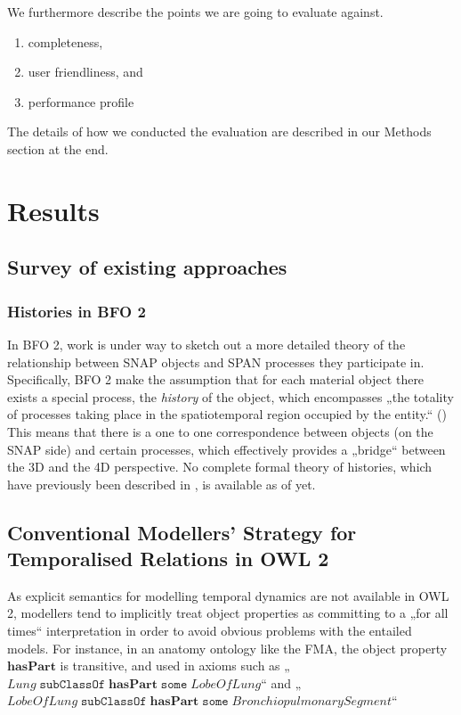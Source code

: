 \documentclass[10pt]{bmc_article}
\newcommand{\mirel}[1]{\ensuremath{\mathrm{\mathbf{#1}}}}
\newcommand{\mclass}[1]{\ensuremath{\mathit{#1}}}
\newenvironment{bmcformat}{\baselineskip20pt\sloppy\setboolean{publ}{false}}{\baselineskip20pt\sloppy}
\begin{document}
\begin{bmcformat}
We furthermore describe the points we are going to evaluate against. 
\begin{enumerate}
	\item completeness, 
	\item user friendliness, and 
	\item performance profile
\end{enumerate}
The details of how we conducted the evaluation are described in our Methods section at the end. 


\section*{Results}

\subsection*{Survey of existing approaches}

\subsubsection*{Histories in BFO 2}

In BFO 2, work is under way to sketch out a more detailed theory of the
relationship between SNAP objects and SPAN processes they participate in.
Specifically, BFO 2 make the assumption that for each material object there
exists a special process, the \emph{history} of the object, which encompasses 
„the totality of processes taking place in the spatiotemporal region occupied by
the entity.“ (\cite{BFO2:ref}) This means that there is a one to one correspondence
between objects (on the SNAP side) and certain processes, which effectively
provides a „bridge“ between the 3D and the 4D perspective. No complete formal theory
of histories, which have previously been described in \cite{cornucopia}, is available as of yet.
\subsection{Conventional Modellers’ Strategy for Temporalised Relations in OWL 2}

As explicit semantics for modelling temporal dynamics are not available in OWL
2, modellers tend to implicitly treat object properties as committing to a 
„for all times“ interpretation in order to avoid obvious problems with the
entailed models. For instance, in an anatomy ontology like the FMA, the object
property \mirel{hasPart} is transitive, and used in axioms such as
„$\mclass{Lung}\;\mathtt{subClassOf}\;\mirel{hasPart}\;\mathtt{some}\;\mclass{LobeOfLung}$“
and „$\mclass{LobeOfLung}\;\mathtt{subClassOf}\;\mirel{hasPart}\;\mathtt{some}\;\mclass{BronchiopulmonarySegment}$“


\end{bmcformat}
\end{document}
